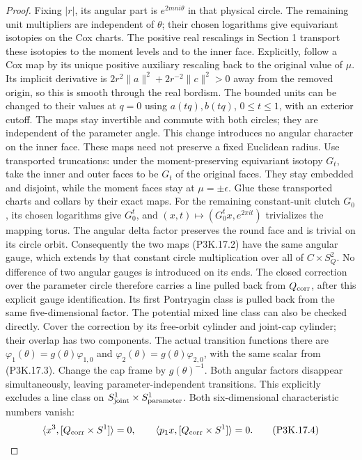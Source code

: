 \begin{proof}
Fixing \(|r|\), its angular part is
\(e^{2mn i\theta}\) in that physical circle.  The remaining
unit multipliers are independent of \(\theta\); their
chosen logarithms give equivariant isotopies on the Cox
charts.  The positive real rescalings in Section 1 transport
these isotopies to the moment levels and to the inner face.
Explicitly, follow a Cox map by its unique positive auxiliary
rescaling back to the original value of \(\mu\).  Its
implicit derivative is
\(2r^2\|a\|^2+2r^{-2}\|c\|^2>0\) away from the
removed origin, so this is smooth through the real bordism.
The bounded units can be changed to their values at \(q=0\)
using \(a(tq),b(tq)\), \(0\le t\le1\), with an
exterior cutoff.  The maps stay invertible and commute with
both circles; they are independent of the parameter angle.
This change introduces no angular character on the inner face.
These maps need not preserve a fixed Euclidean radius.
Use transported truncations: under the moment-preserving
equivariant isotopy \(G_t\), take the inner and outer
faces to be \(G_t\) of the original faces.  They stay
embedded and disjoint, while the moment faces stay at
\(\mu=\pm\epsilon\).  Glue these transported charts
and collars by their exact maps.  For the remaining
constant-unit clutch \(G_0\), its chosen logarithms give
\(G_0^t\), and
\((x,t)\mapsto(G_0^t x,e^{2\pi it})\) trivializes
the mapping torus.  The angular delta factor preserves
the round face and is trivial on its circle orbit.
Consequently the two maps (P3K.17.2) have the same angular
gauge, which extends by that constant circle multiplication
over all of \(C\times S^2_Q\).  No difference of two
angular gauges is introduced on its ends.  The closed
correction over the parameter circle therefore carries
a line pulled back from \(Q_{\rm corr}\), after this
explicit gauge identification.  Its first Pontryagin class
is pulled back from the same five-dimensional factor.
The potential mixed line class can also be checked directly.
Cover the correction by its free-orbit cylinder and joint-cap
cylinder; their overlap has two components.  The actual
transition functions there are
\(\varphi_1(\theta)=g(\theta)\varphi_{1,0}\) and
\(\varphi_2(\theta)=g(\theta)\varphi_{2,0}\), with
the same scalar from (P3K.17.3).  Change the cap frame by
\(g(\theta)^{-1}\).  Both angular factors disappear
simultaneously, leaving parameter-independent transitions.
This explicitly excludes a line class on
\(S^1_{\rm joint}\times S^1_{\rm parameter}\).
Both six-dimensional characteristic numbers vanish:
\[
  \langle x^3,[Q_{\rm corr}\times S^1]\rangle=0,
  \qquad
  \langle p_1x,[Q_{\rm corr}\times S^1]\rangle=0.       \tag{P3K.17.4}
\]


\end{proof}
